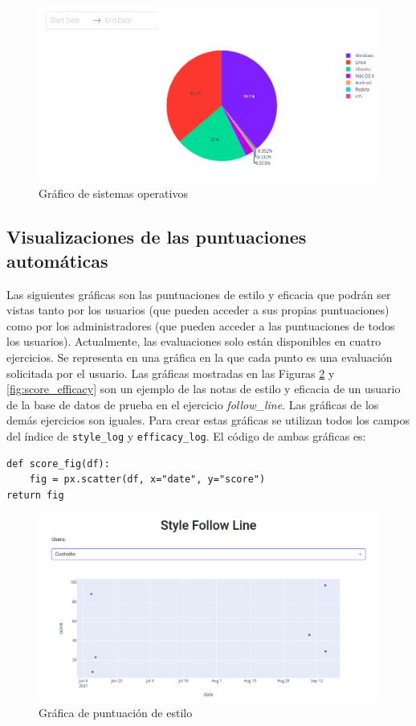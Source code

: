 \begin{figure}[H]
    \centering
    \includegraphics[width=15cm, keepaspectratio]{img/os.png}
    \caption{Gráfico de sistemas operativos}
    \label{fig:os}
\end{figure}
\subsection{Visualizaciones de las puntuaciones automáticas}
Las siguientes gráficas son las puntuaciones de estilo y eficacia que podrán ser vistas tanto por los usuarios (que pueden acceder a sus propias puntuaciones) como por los administradores (que pueden acceder a las puntuaciones de todos los usuarios).  Actualmente, las evaluaciones solo están disponibles en cuatro ejercicios. Se representa en una gráfica en la que cada punto es una evaluación solicitada por el usuario. Las gráficas mostradas en las Figuras \ref{fig:score} y \ref{fig:score_efficacy}  son un ejemplo de las notas de estilo y eficacia de un usuario de la base de datos de prueba en el ejercicio \textit{follow\_line}. Las gráficas de los demás ejercicios son iguales. Para crear estas gráficas se utilizan todos los campos del índice de \texttt{style\_log} y \texttt{efficacy\_log}. El código de ambas gráficas es:
\begin{lstlisting}
def score_fig(df):
    fig = px.scatter(df, x="date", y="score")
return fig
\end{lstlisting}




\begin{figure}[H]
    \centering
    \includegraphics[width=17cm, keepaspectratio]{img/score.png}
    \caption{Gráfica de puntuación de estilo}
    \label{fig:score}
\end{figure}


